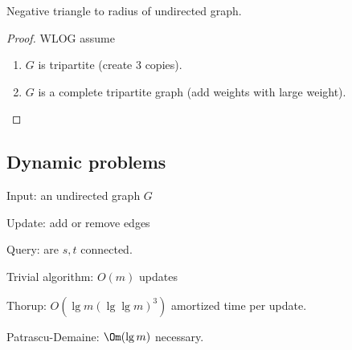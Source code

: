 \begin{thm}
Negative triangle to radius of undirected graph.
\end{thm}
\begin{proof}
WLOG assume
\begin{enumerate}
\item
$G$ is tripartite (create 3 copies).
\item $G$ is a complete tripartite graph (add weights with large weight).
\end{enumerate}
\end{proof}
%
%
%
%
%
%
%
%
%
%
%
%
%
%

\subsection{Dynamic problems}

Input: an undirected graph $G$

Update: add or remove edges

Query: are $s,t$ connected.

Trivial algorithm: $O(m)$ updates

Thorup: $O(\lg m (\lg\lg m)^3)$ amortized time per update. 

Patrascu-Demaine: $\Om(\lg m)$ necessary.

